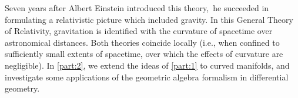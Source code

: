 Seven years after Albert Einstein introduced this theory,\sidenotemark\ he succeeded in formulating a relativistic picture which included gravity.
In this General Theory of Relativity, gravitation is identified with the curvature of spacetime over astronomical distances.
Both theories coincide locally (i.e., when confined to sufficiently small extents of spacetime, over which the effects of curvature are negligible).
In \cref{part:2}, we extend the ideas of \cref{part:1} to curved manifolds, and investigate some applications of the geometric algebra formalism in differential geometry.
